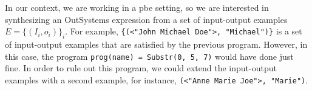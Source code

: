 In our context, we are working in a \gls{pbe} setting, so we are interested in
synthesizing an OutSystems expression from a set of input-output examples
$E = \{(I_i, o_i)\}_i$. For example,
\lstinline|{(<"John Michael Doe">, "Michael")}|
is a set of input-output examples that are satisfied by the previous program.
However, in this case, the program
\lstinline|prog(name) = Substr(0, 5, 7)|
would have done just fine. In order to rule out this program, we could extend
the input-output examples with a second example, for instance,
\lstinline|(<"Anne Marie Joe">, "Marie")|.

